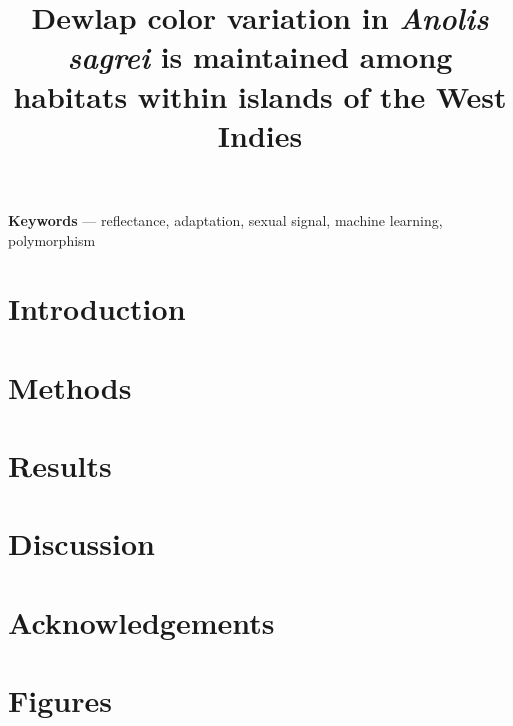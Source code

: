 \documentclass{article}
\title{Dewlap color variation in \textit{Anolis sagrei} is maintained among habitats within islands of the West Indies}
\date{}
\begin{document}
	
	\linenumbers
	
	\maketitle
	
	\begin{abstract}
		
	\end{abstract}
	
	\textbf{Keywords} --- reflectance, adaptation, sexual signal, machine learning, polymorphism
	
	\section*{Introduction}
	
	
	
	\pagebreak
	
	\section*{Methods}
	
	
	
	\pagebreak
	
	\section*{Results}
	
	
	
	\pagebreak
	
	\section*{Discussion}
	
	
	
	\pagebreak
	
	\section*{Acknowledgements}
	
	
	
	\pagebreak
	
	\section*{Figures}
	
	
	
\end{document}

